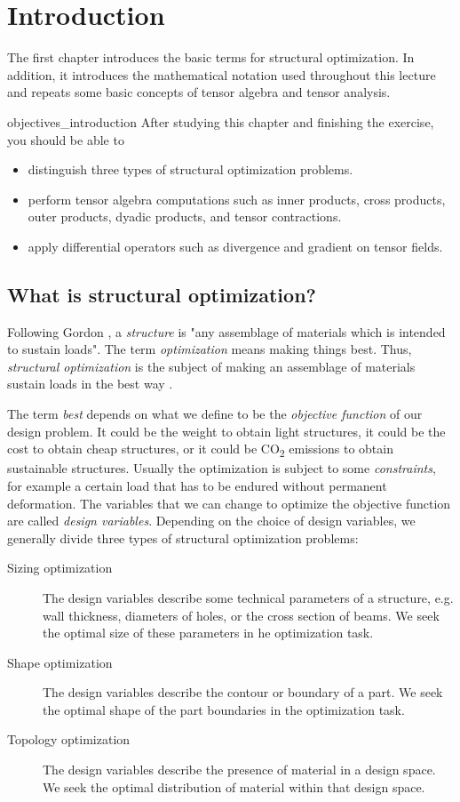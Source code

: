 \chapter{Introduction}
The first chapter introduces the basic terms for structural optimization. In addition, it introduces the mathematical notation used throughout this lecture and repeats some basic concepts of tensor algebra and tensor analysis. 

\begin{objectives}{}{objectives_introduction}
After studying this chapter and finishing the exercise, you should be able to 
\begin{itemize}[label=$\dots$]
    \item distinguish three types of structural optimization problems.
    \item perform tensor algebra computations such as inner products, cross products, outer products, dyadic products, and tensor contractions.
    \item apply differential operators such as divergence and gradient on tensor fields.
\end{itemize}
\end{objectives}


\section{What is structural optimization?}
Following Gordon \cite{Gordon2003}, a \emph{structure} is "any assemblage of materials which is intended to sustain loads". The term \emph{optimization} means making things best. Thus, \emph{structural optimization} is the subject of making an assemblage of materials sustain loads in the best way \cite{Christensen2008}. 

The term \emph{best} depends on what we define to be the \emph{objective function} of our design problem. It could be the weight to obtain light structures, it could be the cost to obtain cheap structures, or it could be CO\textsubscript{2} emissions to obtain sustainable structures. Usually the optimization is subject to some \emph{constraints}, for example a certain load that has to be endured without permanent deformation. The variables that we can change to optimize the objective function are called \emph{design variables}. Depending on the choice of design variables, we generally divide three types of structural optimization problems: 
\begin{description}
    \item[Sizing optimization]{The design variables describe some technical parameters of a structure, e.g. wall thickness, diameters of holes, or the cross section of beams. We seek the optimal size of these parameters in he optimization task.}
    \item[Shape optimization]{The design variables describe the contour or boundary of a part. We seek the optimal shape of the part boundaries in the optimization task.}
    \item[Topology optimization]{The design variables describe the presence of material in a design space. We seek the optimal distribution of material within that design space.}
\end{description}

